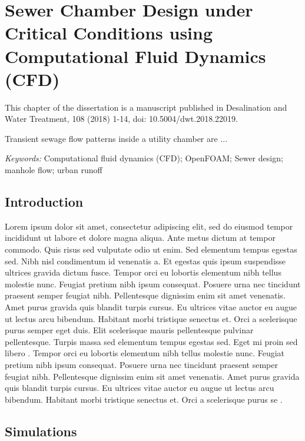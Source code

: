 
\chapter{Sewer Chamber Design under Critical Conditions using Computational
Fluid Dynamics (CFD)}

This chapter of the dissertation is a manuscript published in Desalination
and Water Treatment, 108 (2018) 1-14, doi: 10.5004/dwt.2018.22019.

Transient sewage flow patterns inside a utility chamber are ... 

\textit{Keywords: }Computational fluid dynamics (CFD); OpenFOAM; Sewer
design; manhole flow; urban runoff

\section{Introduction}

Lorem ipsum dolor sit amet, consectetur adipiscing elit, sed do eiusmod
tempor incididunt ut labore et dolore magna aliqua. Ante metus dictum
at tempor commodo. Quis risus sed vulputate odio ut enim. Sed elementum
tempus egestas sed. Nibh nisl condimentum id venenatis a\citep{Balogh-JoWEaIA-2012-10.1016_j.jweia.2012.02.023,Greifzu-EAoCFM-2016-10.1080_19942060.2015.1104266}.
Et egestas quis ipsum suspendisse ultrices gravida dictum fusce. Tempor
orci eu lobortis elementum nibh tellus molestie nunc. Feugiat pretium
nibh ipsum consequat. Posuere urna nec tincidunt praesent semper feugiat
nibh. Pellentesque dignissim enim sit amet venenatis. Amet purus gravida
quis blandit turpis cursus. Eu ultrices vitae auctor eu augue ut lectus
arcu bibendum. Habitant morbi tristique senectus et. Orci a scelerisque
purus semper eget duis. Elit scelerisque mauris pellentesque pulvinar
pellentesque. Turpis massa sed elementum tempus egestas sed. Eget
mi proin sed libero \citep{Kang-D-2017-10.1016_j.desal.2017.05.018,Kim-DaWT-2017:10.5004_dwt.2017.11423,Kim-DaWT-2017:10.5004_dwt.2017.11422}.
Tempor orci eu lobortis elementum nibh tellus molestie nunc. Feugiat
pretium nibh ipsum consequat. Posuere urna nec tincidunt praesent
semper feugiat nibh. Pellentesque dignissim enim sit amet venenatis.
Amet purus gravida quis blandit turpis cursus. Eu ultrices vitae auctor
eu augue ut lectus arcu bibendum. Habitant morbi tristique senectus
et. Orci a scelerisque purus se  \citep{AhrensGeveciEtAl-2005,Ayachit-2015}.

\section{Simulations}

